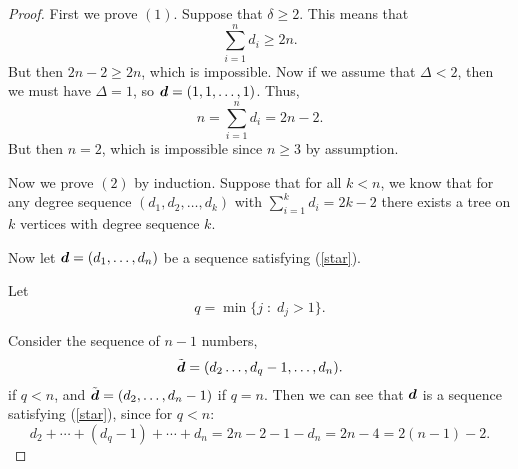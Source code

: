 \documentclass{unswmaths}
\begin{document}
\begin{proof}
    First we prove $(1)$. Suppose that $\delta \geq 2$. This means that
    \begin{equation}
        \sum_{i=1}^n d_i \geq 2n.
    \end{equation}
    But then $2n-2 \geq 2n$, which is impossible. Now if we assume that $\Delta < 2$,
    then we must have $\Delta = 1$, so $\boldsymbol{d} = (1,1,\ldots,1)$. Thus,
    \begin{equation}
        n = \sum_{i=1}^n d_i = 2n-2.
    \end{equation}
    But then $n = 2$, which is impossible since $n \geq 3$ by assumption.
    
    Now we prove $(2)$ by induction. Suppose that for all $k < n$, we know
    that for any degree sequence $(d_1,d_2,\ldots,d_k)$ with $\sum_{i=1}^k d_i = 2k-2$
    there exists a tree on $k$ vertices with degree sequence $k$.
    
    Now let $\boldsymbol{d} = (d_1,\ldots,d_n)$ be a sequence satisfying (\ref{star}).
    
    Let
    \begin{equation}
        q = \min\{ j \;:\; d_j > 1\}.
    \end{equation}
%            
    
    Consider
    the sequence of $n-1$ numbers,
    \begin{equation}
        \tilde{\boldsymbol{d}} = (d_2\ldots,d_q-1,\ldots,d_n).
    \end{equation}
    if $q < n$, and $\tilde{\boldsymbol{d}} = (d_2,\ldots,d_n-1)$ if $q = n$.
    Then we can see that $\boldsymbol{d}$ is a sequence satisfying (\ref{star}), since
    for $q < n$:
    \begin{equation}
        d_2+\cdots+(d_q-1) + \cdots + d_n = 2n-2-1-d_n = 2n-4 = 2(n-1) - 2.
    \end{equation}
    

\end{proof}
\end{document}
